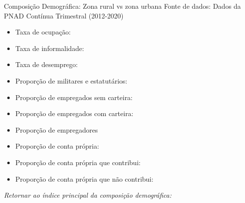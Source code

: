 \begin{frame}[label=_composicao_demografica_rural_urbano]{Composição Demográfica: Zona rural vs zona urbana}
{\footnotesize Fonte de dados: Dados da PNAD Contínua Trimestral (2012-2020)}
\begin{itemize}
\item{Taxa de ocupação: \hyperlink{_composicao_demografica_rural_urbano_taxa_de_ocupacao}{}}
\item{Taxa de informalidade: \hyperlink{_composicao_demografica_rural_urbano_taxa_de_informalidade}{}}
\item{Taxa de desemprego: \hyperlink{_composicao_demografica_rural_urbano_taxa_de_desemprego}{}}
\item{Proporção de militares e estatutários: \hyperlink{_composicao_demografica_rural_urbano_prop_militar}{}}
\item{Proporção de empregados sem carteira: \hyperlink{_composicao_demografica_rural_urbano_prop_empregadoSC}{}}
\item{Proporção de empregados com carteira: \hyperlink{_composicao_demografica_rural_urbano_prop_empregadoCC}{}}
\item{Proporção de empregadores \hyperlink{_composicao_demografica_rural_urbano_prop_empregador}{}}
\item{Proporção de conta própria: \hyperlink{_composicao_demografica_rural_urbano_prop_cpropria}{}}
\item{Proporção de conta própria que contribui: \hyperlink{_composicao_demografica_rural_urbano_prop_cpropriaC}{}}
\item{Proporção de conta própria que não contribui: \hyperlink{_composicao_demografica_rural_urbano_prop_cpropriaNc}{}}
\end{itemize}

\begin{small}
\textit{Retornar ao índice principal da composição demográfica: \hyperlink{_composicao_demografica}{} }
\end{small}

\end{frame}


